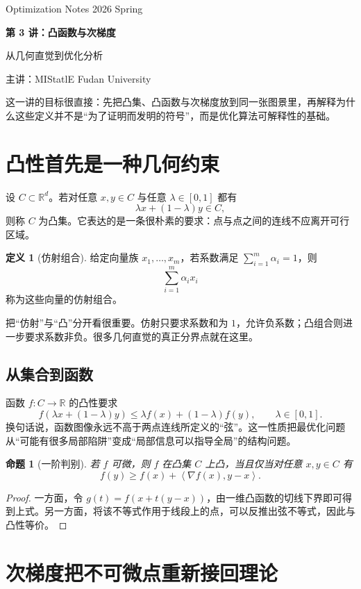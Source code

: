 \documentclass[11pt]{article}
\newcounter{lecnum}
\numberwithin{equation}{section}
\newcommand{\LectureAffiliation}{Fudan University}
\newcommand{\LectureBanner}[6]{%
  \setcounter{lecnum}{#1}%
  \setcounter{page}{1}%
  \setcounter{section}{0}%
  \setcounter{equation}{0}%
  \markright{#2}%
  \begin{tcolorbox}[
    cn-panel,
    colback=keybg,
    colframe=brandD,
    borderline west={4pt}{0pt}{accent}
  ]
    {\sffamily\small\color{ink!60} #4 \hfill #5}\par
    \vspace{0.35em}
    {\bfseries\fontsize{22}{26}\selectfont\color{keydark} 第 #1 讲：#2\par}
    \vspace{0.2em}
    {\large\color{brand} #3\par}
    \vspace{0.7em}
    {\small\sffamily\color{ink!72} 主讲：#6 \hfill {\color{brandD}\LectureAffiliation}}
  \end{tcolorbox}
  \vspace{0.7em}
}
\theoremstyle{plain}
\newtheorem{proposition}[theorem]{命题}
\theoremstyle{definition}
\newtheorem{definition}[theorem]{定义}
\theoremstyle{remark}
\newcommand{\R}{\mathbb{R}}
\newcommand{\ip}[2]{\left\langle #1, #2 \right\rangle}
\begin{document}
\LectureBanner
  {3}
  {凸函数与次梯度}
  {从几何直觉到优化分析}
  {Optimization Notes}
  {2026 Spring}
  {MIStatlE}

\begin{SummaryBox}
这一讲的目标很直接：先把凸集、凸函数与次梯度放到同一张图景里，再解释为什么这些定义并不是“为了证明而发明的符号”，而是优化算法可解释性的基础。
\end{SummaryBox}

\section{凸性首先是一种几何约束}

设 $C \subset \R^d$。若对任意 $x,y \in C$ 与任意 $\lambda \in [0,1]$ 都有
\[
\lambda x + (1-\lambda)y \in C,
\]
则称 $C$ 为凸集。它表达的是一条很朴素的要求：点与点之间的连线不应离开可行区域。

\begin{definition}[仿射组合]
给定向量族 $x_1,\dots,x_m$，若系数满足 $\sum_{i=1}^m \alpha_i = 1$，则
\[
\sum_{i=1}^m \alpha_i x_i
\]
称为这些向量的仿射组合。
\end{definition}

\begin{AnalysisBox}
把“仿射”与“凸”分开看很重要。仿射只要求系数和为 $1$，允许负系数；凸组合则进一步要求系数非负。很多几何直觉的真正分界点就在这里。
\end{AnalysisBox}

\subsection{从集合到函数}

函数 $f:C\to \R$ 的凸性要求
\[
f(\lambda x+(1-\lambda)y) \le \lambda f(x)+(1-\lambda)f(y), \qquad \lambda\in[0,1].
\]
换句话说，函数图像永远不高于两点连线所定义的“弦”。这一性质把最优化问题从“可能有很多局部陷阱”变成“局部信息可以指导全局”的结构问题。

\begin{proposition}[一阶判别]
若 $f$ 可微，则 $f$ 在凸集 $C$ 上凸，当且仅当对任意 $x,y\in C$ 有
\[
f(y)\ge f(x) + \ip{\nabla f(x)}{y-x}.
\]
\end{proposition}

\begin{proof}
一方面，令 $g(t)=f(x+t(y-x))$，由一维凸函数的切线下界即可得到上式。另一方面，将该不等式作用于线段上的点，可以反推出弦不等式，因此与凸性等价。
\end{proof}

\section{次梯度把不可微点重新接回理论}
\end{document}
